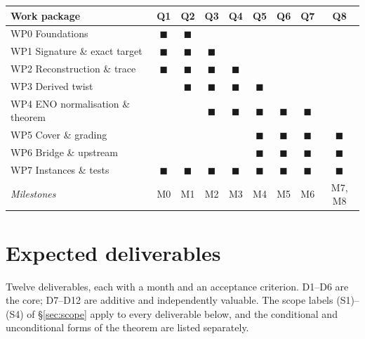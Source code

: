 \documentclass[11pt,a4paper]{article}
\theoremstyle{remark}
\begin{document}
\begin{center}
\small
\begin{tabular}{@{}l*{8}{c}@{}}
\toprule
\textbf{Work package} & \textbf{Q1} & \textbf{Q2} & \textbf{Q3} & \textbf{Q4} &
\textbf{Q5} & \textbf{Q6} & \textbf{Q7} & \textbf{Q8} \\
\midrule
WP0 Foundations & $\blacksquare$ & $\blacksquare$ & & & & & & \\
WP1 Signature \& exact target & $\blacksquare$ & $\blacksquare$ & $\blacksquare$ & & & & & \\
WP2 Reconstruction \& trace & $\blacksquare$ & $\blacksquare$ & $\blacksquare$ & $\blacksquare$ & & & & \\
WP3 Derived twist & & $\blacksquare$ & $\blacksquare$ & $\blacksquare$ & $\blacksquare$ & & & \\
WP4 ENO normalisation \& theorem & & & $\blacksquare$ & $\blacksquare$ & $\blacksquare$ & $\blacksquare$ & $\blacksquare$ & \\
WP5 Cover \& grading & & & & & $\blacksquare$ & $\blacksquare$ & $\blacksquare$ & $\blacksquare$ \\
WP6 Bridge \& upstream & & & & & $\blacksquare$ & $\blacksquare$ & $\blacksquare$ & $\blacksquare$ \\
WP7 Instances \& tests & $\blacksquare$ & $\blacksquare$ & $\blacksquare$ & $\blacksquare$ & $\blacksquare$ & $\blacksquare$ & $\blacksquare$ & $\blacksquare$ \\
\midrule
\emph{Milestones} & M0 & M1 & M2 & M3 & M4 & M5 & M6 & M7, M8 \\
\bottomrule
\end{tabular}
\end{center}

\section{Expected deliverables}\label{sec:deliverables}

Twelve deliverables, each with a month and an acceptance criterion. D1--D6 are the core; D7--D12
are additive and independently valuable. The scope labels (S1)--(S4) of \S\ref{sec:scope}
apply to every deliverable below, and the conditional and unconditional forms of the theorem are
listed separately.
\end{document}
